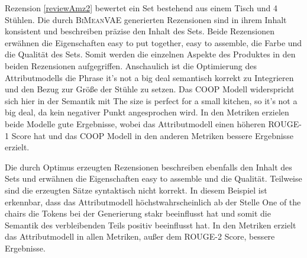 Rezension \ref{reviewAmz2} bewertet ein Set bestehend aus einem Tisch und 4 Stühlen.
Die durch \textsc{BiMeanVAE} generierten Rezensionen sind in ihrem Inhalt konsistent und beschreiben präzise den Inhalt des Sets.
Beide Rezensionen erwähnen die Eigenschaften \glqq{}easy to put together\grqq{}, \glqq{}easy to assemble\grqq{}, die Farbe und die Qualität des Sets.
Somit werden die einzelnen Aspekte des Produktes in den beiden Rezensionen aufgegriffen.
Anschaulich ist die Optimierung des Attributmodells die Phrase \glqq{}it's not a big deal\grqq{} semantisch korrekt zu Integrieren und den Bezug zur Größe der Stühle zu setzen.
Das COOP Modell widerspricht sich hier in der Semantik mit \glqq{}The size is perfect for a small kitchen, so it's not a big deal\grqq{}, da kein negativer Punkt angesprochen wird.
In den Metriken erzielen beide Modelle gute Ergebnisse, wobei das Attributmodell einen höheren ROUGE-1 Score hat und das COOP Modell in den anderen Metriken bessere Ergebnisse erzielt.

Die durch Optimus erzeugten Rezensionen beschreiben ebenfalls den Inhalt des Sets und erwähnen die Eigenschaften \glqq{}easy to assemble\grqq{} und die Qualität.
Teilweise sind die erzeugten Sätze syntaktisch nicht korrekt. 
In diesem Beispiel ist erkennbar, dass das Attributmodell höchstwahrscheinlich ab der Stelle \glqq{}One of the chairs\grqq{} die Tokens bei der Generierung stakr beeinflusst hat und somit die Semantik des verbleibenden Teils positiv beeinflusst hat.
In den Metriken erzielt das Attributmodell in allen Metriken, außer dem ROUGE-2 Score, bessere Ergebnisse.

